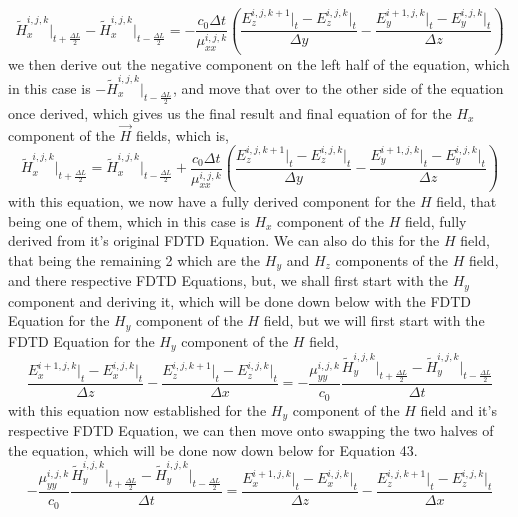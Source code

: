 \documentclass[]{article}
\begin{document}
\begin{equation}
\tilde{H}_{x}^{i,j,k}\Big|_{t+\frac{\Delta{L}}{2}} - \tilde{H}_{x}^{i,j,k}\Big|_{t - \frac{\Delta{L}}{2}} = -\frac{c_0\Delta{t}}{\mu_{xx}^{i,j,k}} \left(\frac{E_{z}^{i, j, k+1} \Big|_t - E_{z}^{i,j,k}\Big|_t}{\Delta{y}} - \frac{E_{y}^{i+1, j, k} \Big|_t - E_{y}^{i,j,k}\Big|_t}{\Delta{z}}\right)
\end{equation}
we then derive out the negative component on the left half of the equation, which in this case is $-\tilde{H}_{x}^{i,j,k}\Big|_{t - \frac{\Delta{L}}{2}}$, and move that over to the other side of the equation once derived, which gives us the final result and final equation of for the $H_x$ component of the $\vec{H}$ fields, which is,
\begin{equation}
\tilde{H}_{x}^{i,j,k}\Big|_{t+\frac{\Delta{L}}{2}} = \tilde{H}_{x}^{i,j,k}\Big|_{t - \frac{\Delta{L}}{2}} + \frac{c_0\Delta{t}}{\mu_{xx}^{i,j,k}} \left(\frac{E_{z}^{i, j, k+1} \Big|_t - E_{z}^{i,j,k}\Big|_t}{\Delta{y}} - \frac{E_{y}^{i+1, j, k} \Big|_t - E_{y}^{i,j,k}\Big|_t}{\Delta{z}}\right)
\end{equation}
with this equation, we now have a fully derived component for the $H$ field, that being one of them, which in this case is $H_x$ component of the $H$ field, fully derived from it's original FDTD Equation. We can also do this for the $H$ field, that being the remaining 2 which are the $H_y$ and $H_z$ components of the $H$ field, and there respective FDTD Equations, but, we shall first start with the $H_y$ component and deriving it, which will be done down below with the FDTD Equation for the $H_y$ component of the $H$ field, but we will first start with the FDTD Equation for the $H_y$ component of the $H$ field,
\begin{equation}
\frac{E_{x}^{i+1, j, k} \Big|_t - E_{x}^{i,j,k}\Big|_t}{\Delta{z}} - \frac{E_{z}^{i, j, k+1} \Big|_t - E_{z}^{i,j,k}\Big|_t}{\Delta{x}} = -\frac{\mu_{yy}^{i,j,k}}{c_0} \frac{\tilde{H}_{y}^{i,j,k}\Big|_{t+\frac{\Delta{L}}{2}} - \tilde{H}_{y}^{i,j,k}\Big|_{t - \frac{\Delta{L}}{2}}}{\Delta{t}}
\end{equation}
with this equation now established for the $H_y$ component of the $H$ field and it's respective FDTD Equation, we can then move onto swapping the two halves of the equation, which will be done now down below for Equation 43.
\begin{equation}
-\frac{\mu_{yy}^{i,j,k}}{c_0} \frac{\tilde{H}_{y}^{i,j,k}\Big|_{t+\frac{\Delta{L}}{2}} - \tilde{H}_{y}^{i,j,k}\Big|_{t - \frac{\Delta{L}}{2}}}{\Delta{t}} = \frac{E_{x}^{i+1, j, k} \Big|_t - E_{x}^{i,j,k}\Big|_t}{\Delta{z}} - \frac{E_{z}^{i, j, k+1} \Big|_t - E_{z}^{i,j,k}\Big|_t}{\Delta{x}}
\end{equation}
\end{document}
